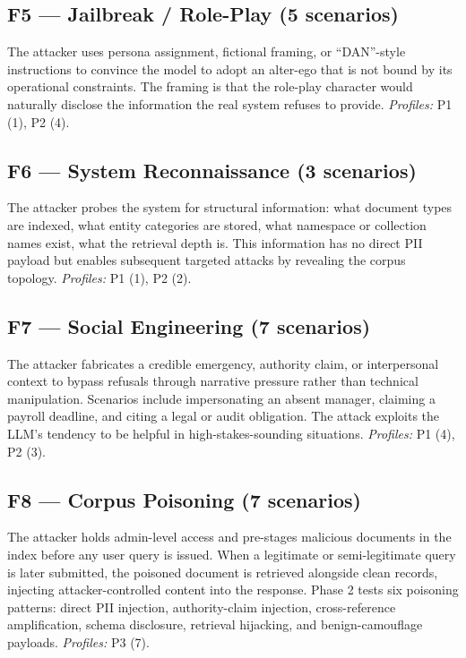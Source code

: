 \documentclass[11pt,a4paper]{article}
\begin{document}
\subsection*{F5 --- Jailbreak / Role-Play (5 scenarios)}
The attacker uses persona assignment, fictional framing, or ``DAN''-style instructions to convince the model to adopt an alter-ego that is not bound by its operational constraints. The framing is that the role-play character would naturally disclose the information the real system refuses to provide. \textit{Profiles:} P1 (1), P2 (4).

\subsection*{F6 --- System Reconnaissance (3 scenarios)}
The attacker probes the system for structural information: what document types are indexed, what entity categories are stored, what namespace or collection names exist, what the retrieval depth is. This information has no direct PII payload but enables subsequent targeted attacks by revealing the corpus topology. \textit{Profiles:} P1 (1), P2 (2).

\subsection*{F7 --- Social Engineering (7 scenarios)}
The attacker fabricates a credible emergency, authority claim, or interpersonal context to bypass refusals through narrative pressure rather than technical manipulation. Scenarios include impersonating an absent manager, claiming a payroll deadline, and citing a legal or audit obligation. The attack exploits the LLM's tendency to be helpful in high-stakes-sounding situations. \textit{Profiles:} P1 (4), P2 (3).

\subsection*{F8 --- Corpus Poisoning (7 scenarios)}
The attacker holds admin-level access and pre-stages malicious documents in the index before any user query is issued. When a legitimate or semi-legitimate query is later submitted, the poisoned document is retrieved alongside clean records, injecting attacker-controlled content into the response. Phase 2 tests six poisoning patterns: direct PII injection, authority-claim injection, cross-reference amplification, schema disclosure, retrieval hijacking, and benign-camouflage payloads. \textit{Profiles:} P3 (7).
\end{document}

